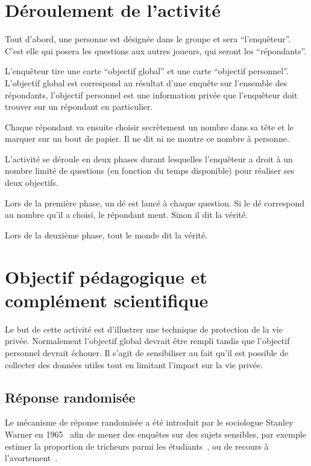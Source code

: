\documentclass[a4paper, 12pt]{article}
\begin{document}
\section*{Déroulement de l'activité}

Tout d'abord, une personne est désignée dans le groupe et sera \enquote{l'enquêteur}. C'est elle qui posera les questions aux autres joueurs, qui seront les \enquote{répondants}.

L'enquêteur tire une carte \enquote{objectif global} et une carte \enquote{objectif personnel}. L'objectif global est correspond au résultat d'une enquête sur l'ensemble des répondants, l'objectif personnel est une information privée que l'enquêteur doit trouver sur un répondant en particulier.

Chaque répondant va ensuite choisir secrètement un nombre dans sa tête et le marquer sur un bout de papier. Il ne dit ni ne montre ce nombre à personne.

L'activité se déroule en deux phases durant lesquelles l'enquêteur a droit à un nombre limité de questions (en fonction du temps disponible) pour réaliser ses deux objectifs.

Lors de la première phase, un dé est lancé à chaque question.
Si le dé correspond au nombre qu'il a choisi, le répondant ment. Sinon il dit la vérité.

Lors de la deuxième phase, tout le monde dit la vérité.



\section*{Objectif pédagogique et complément scientifique}
Le but de cette activité est d'illustrer une technique de protection de la vie privée.
Normalement l'objectif global devrait être rempli tandis que l'objectif personnel devrait échouer.
Il s'agit de sensibiliser au fait qu'il est possible de collecter des données utiles tout en limitant l'impact sur la vie privée.

\subsection*{Réponse randomisée}

Le mécanisme de réponse randomisée a été introduit par le sociologue Stanley Warner en 1965~\cite{rr} afin de mener des enquêtes sur des sujets sensibles, par exemple estimer la proportion de tricheurs parmi les étudiants~\cite{scheers1987improved}, ou de recours à l'avortement~\cite{abernathy1970estimates}.
\end{document}
